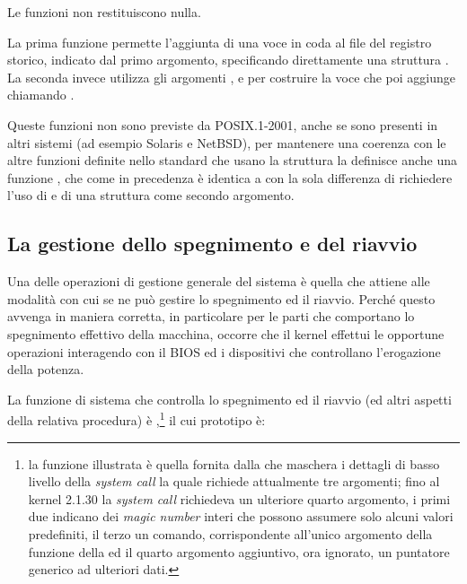 \begin{funcproto}{
}

{Le funzioni non restituiscono nulla.}
\end{funcproto}

La prima funzione permette l'aggiunta di una voce in coda al file del registro
storico, indicato dal primo argomento, specificando direttamente una struttura
.  La seconda invece utilizza gli argomenti ,
 e  per costruire la voce che poi aggiunge chiamando
.

Queste funzioni non sono previste da POSIX.1-2001, anche se sono presenti in
altri sistemi (ad esempio Solaris e NetBSD), per mantenere una coerenza con le
altre funzioni definite nello standard che usano la struttura 
la  definisce anche una funzione , che come in
precedenza è identica a  con la sola differenza di richiedere
l'uso di  e di una struttura  come secondo
argomento. 


\subsection{La gestione dello spegnimento e del riavvio}
\label{sec:sys_reboot}

Una delle operazioni di gestione generale del sistema è quella che attiene
alle modalità con cui se ne può gestire lo spegnimento ed il riavvio.  Perché
questo avvenga in maniera corretta, in particolare per le parti che comportano
lo spegnimento effettivo della macchina, occorre che il kernel effettui le
opportune operazioni interagendo con il BIOS ed i dispositivi che controllano
l'erogazione della potenza.

La funzione di sistema che controlla lo spegnimento ed il riavvio (ed altri
aspetti della relativa procedura) è ,\footnote{la funzione
  illustrata è quella fornita dalla  che maschera i dettagli di
  basso livello della \textit{system call} la quale richiede attualmente tre
  argomenti; fino al kernel 2.1.30 la \textit{system call} richiedeva un
  ulteriore quarto argomento, i primi due indicano dei \textit{magic number}
  interi che possono assumere solo alcuni valori predefiniti, il terzo un
  comando, corrispondente all'unico argomento della funzione della 
  ed il quarto argomento aggiuntivo, ora ignorato, un puntatore generico ad
  ulteriori dati.}  il cui prototipo è:

